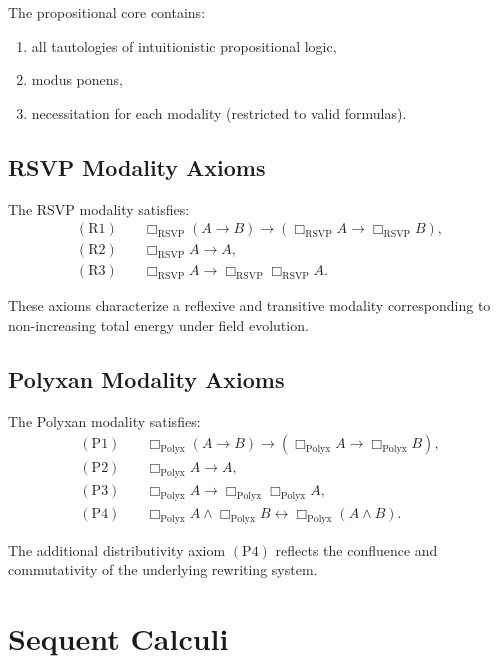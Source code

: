 The propositional core contains:
\begin{enumerate}
\item all tautologies of intuitionistic propositional logic,
\item modus ponens,
\item necessitation for each modality (restricted to valid formulas).
\end{enumerate}

\subsection{RSVP Modality Axioms}

The RSVP modality satisfies:
\begin{align*}
\mathrm{(R1)} &\quad \Box_{\mathrm{RSVP}}(A \to B) \to (\Box_{\mathrm{RSVP}}A \to \Box_{\mathrm{RSVP}}B), \\
\mathrm{(R2)} &\quad \Box_{\mathrm{RSVP}}A \to A, \\
\mathrm{(R3)} &\quad \Box_{\mathrm{RSVP}}A \to \Box_{\mathrm{RSVP}}\Box_{\mathrm{RSVP}}A.
\end{align*}

These axioms characterize a reflexive and transitive modality corresponding to non-increasing total energy under field evolution.

\subsection{Polyxan Modality Axioms}

The Polyxan modality satisfies:
\begin{align*}
\mathrm{(P1)} &\quad \Box_{\mathrm{Polyx}}(A \to B) \to (\Box_{\mathrm{Polyx}}A \to \Box_{\mathrm{Polyx}}B), \\
\mathrm{(P2)} &\quad \Box_{\mathrm{Polyx}}A \to A, \\
\mathrm{(P3)} &\quad \Box_{\mathrm{Polyx}}A \to \Box_{\mathrm{Polyx}}\Box_{\mathrm{Polyx}}A, \\
\mathrm{(P4)} &\quad \Box_{\mathrm{Polyx}}A \wedge \Box_{\mathrm{Polyx}}B \leftrightarrow \Box_{\mathrm{Polyx}}(A \wedge B).
\end{align*}

The additional distributivity axiom $(\mathrm{P4})$ reflects the confluence and commutativity of the underlying rewriting system.

\section{Sequent Calculi}

